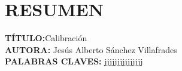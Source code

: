 \newpage
\chapter*{RESUMEN}
\label{sec:resum}

\textbf{TÍTULO:}Calibración\\

\textbf{AUTORA:} Jesús Alberto Sánchez Villafrades\\

\textbf{PALABRAS CLAVES: } jjjjjjjjjjjjjjj\\

